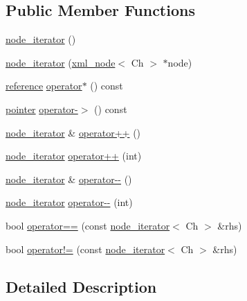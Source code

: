 \subsection*{Public Member Functions}
\begin{DoxyCompactItemize}
\item 
\hyperlink{classrapidxml_1_1node__iterator_a4e1244b9e9e1d2b5129235806d1e31ad}{node\_\-iterator} ()
\item 
\hyperlink{classrapidxml_1_1node__iterator_a94c3da59b54e4bd003e226cc35b3c266}{node\_\-iterator} (\hyperlink{classrapidxml_1_1xml__node}{xml\_\-node}$<$ Ch $>$ $\ast$node)
\item 
\hyperlink{classrapidxml_1_1xml__node}{reference} \hyperlink{classrapidxml_1_1node__iterator_ab31fe5bc1fd01fee8a2b31c3e42d78ed}{operator$\ast$} () const 
\item 
\hyperlink{classrapidxml_1_1xml__node}{pointer} \hyperlink{classrapidxml_1_1node__iterator_a9b3e7d58c4a628524914932e0663ddfb}{operator-\/$>$} () const 
\item 
\hyperlink{classrapidxml_1_1node__iterator}{node\_\-iterator} \& \hyperlink{classrapidxml_1_1node__iterator_a8d6b184a76b2ec8a8b5e90bc013c80ed}{operator++} ()
\item 
\hyperlink{classrapidxml_1_1node__iterator}{node\_\-iterator} \hyperlink{classrapidxml_1_1node__iterator_ad01b4e43e348a330984833fd4924d0f2}{operator++} (int)
\item 
\hyperlink{classrapidxml_1_1node__iterator}{node\_\-iterator} \& \hyperlink{classrapidxml_1_1node__iterator_ace52107ecd1bcf02e49619e86206e3a3}{operator-\/-\/} ()
\item 
\hyperlink{classrapidxml_1_1node__iterator}{node\_\-iterator} \hyperlink{classrapidxml_1_1node__iterator_a4ca35716bb7865f199a137b063af6080}{operator-\/-\/} (int)
\item 
bool \hyperlink{classrapidxml_1_1node__iterator_a5cb8a3b0d65a1a2517995e986a4debfd}{operator==} (const \hyperlink{classrapidxml_1_1node__iterator}{node\_\-iterator}$<$ Ch $>$ \&rhs)
\item 
bool \hyperlink{classrapidxml_1_1node__iterator_a20f1e25347d7e3856694f18597f7c8e2}{operator!=} (const \hyperlink{classrapidxml_1_1node__iterator}{node\_\-iterator}$<$ Ch $>$ \&rhs)
\end{DoxyCompactItemize}


\subsection{Detailed Description}
